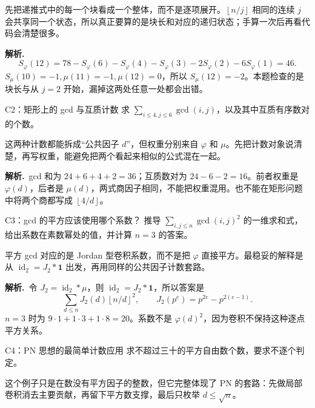 \documentclass[UTF8,a4paper,11pt,twoside,openright,fontset=fandol]{ctexbook}
\theoremstyle{definition}
\newcommand{\one}{\mathbf 1}
\newcommand{\id}{\operatorname{id}}
\newcommand{\floor}[1]{\left\lfloor #1\right\rfloor}
\newcommand{\sol}{\par\noindent\textbf{解析.}\ }
\begin{document}
\begin{pitfall}[讲解：先看这题到底在做什么]
先把递推式中的每一个块看成一个整体，而不是逐项展开。$\floor{n/j}$ 相同的连续 $j$ 会共享同一个状态，所以真正要算的是块长和对应的递归状态；手算一次后再看代码会清楚很多。
\end{pitfall}

\sol
\[
S_\varphi(12)=78-S_\varphi(6)-S_\varphi(4)-S_\varphi(3)-2S_\varphi(2)-6S_\varphi(1)=46.
\]
$S_\mu(10)=-1,\mu(11)=-1,\mu(12)=0$，所以 $S_\mu(12)=-2$。本题检查的是块长与从 $j=2$ 开始，漏掉这两处任意一处都会出错。


\begin{problem}{C2：矩形上的 gcd 与互质计数}
求 $\sum_{i\le4,j\le6}\gcd(i,j)$，以及其中互质有序数对的个数。
\end{problem}

\begin{pitfall}[讲解：先看这题到底在做什么]
这两种计数都能拆成“公共因子 $d$”，但权重分别来自 $\varphi$ 和 $\mu$。先把计数对象说清楚，再写权重，能避免把两个看起来相似的公式混在一起。
\end{pitfall}

\sol gcd 和为 $24+6+4+2=36$；互质数对为 $24-6-2=16$。前者权重是 $\varphi(d)$，后者是 $\mu(d)$，两式商因子相同，不能把权重混用。也不能在矩形问题中将两个商都写成 $\floor{4/d}$。


\begin{problem}{C3：gcd 的平方应该使用哪个系数？}
推导 $\sum_{i,j\le n}\gcd(i,j)^2$ 的一维求和式，给出系数在素数幂处的值，并计算 $n=3$ 的答案。
\end{problem}

\begin{pitfall}[讲解：先看这题到底在做什么]
平方 gcd 对应的是 Jordan 型卷积系数，而不是把 $\varphi$ 直接平方。最稳妥的解释是从 $\id_2=J_2*\one$ 出发，再用同样的公共因子计数套路。
\end{pitfall}

\sol 令 $J_2=\id_2*\mu$，则 $\id_2=J_2*\one$，所以答案是
\[
 \sum_{d\le n}J_2(d)\floor{n/d}^2,\qquad
 J_2(p^e)=p^{2e}-p^{2(e-1)}.
\]
$n=3$ 时为 $9\cdot1+1\cdot3+1\cdot8=20$。系数不是 $\varphi(d)^2$，因为卷积不保持这种逐点平方关系。


\begin{problem}{C4：PN 思想的最简单计数应用}
求不超过三十的平方自由数个数，要求不逐个判定。
\end{problem}

\begin{pitfall}[讲解：先看这题到底在做什么]
这个例子只是在数没有平方因子的整数，但它完整体现了 PN 的套路：先做局部卷积消去主要贡献，再留下平方数支撑，最后只枚举 $d\le\sqrt n$。
\end{pitfall}
\end{document}
